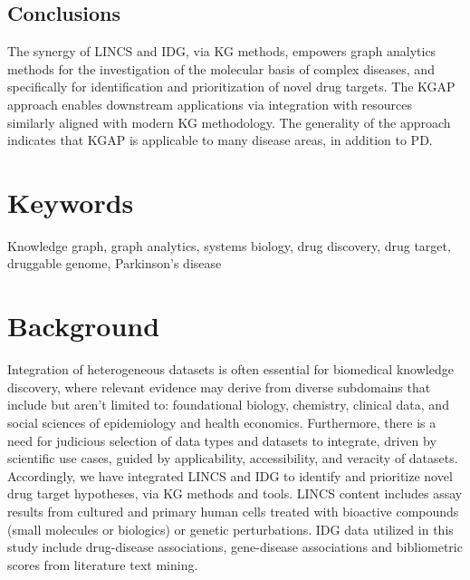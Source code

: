 \subsection{Conclusions}

The synergy of LINCS and IDG, via KG methods, empowers graph analytics methods for the investigation of the molecular basis of complex diseases, and specifically for identification and prioritization of novel drug targets. The KGAP approach enables downstream applications via integration with resources similarly aligned with modern KG methodology. The generality of the approach indicates that KGAP is applicable to many disease areas, in addition to PD.

\section{Keywords}
Knowledge graph, graph analytics, systems biology, drug discovery, drug target, druggable genome, Parkinson's disease

\section{Background}

Integration of heterogeneous datasets is often essential for biomedical knowledge discovery, where relevant evidence may derive from diverse subdomains that include but aren't limited to: foundational biology, chemistry, clinical data, and social sciences of epidemiology and health economics. Furthermore, there is a need for judicious selection of data types and datasets to integrate, driven by scientific use cases, guided by applicability, accessibility, and veracity of datasets. Accordingly, we have integrated LINCS and IDG to identify and prioritize novel drug target hypotheses, via KG methods and tools. LINCS content includes assay results from cultured and primary human cells treated with bioactive compounds (small molecules or biologics) or genetic perturbations. IDG data utilized in this study include drug-disease associations, gene-disease associations and bibliometric scores from literature text mining.

